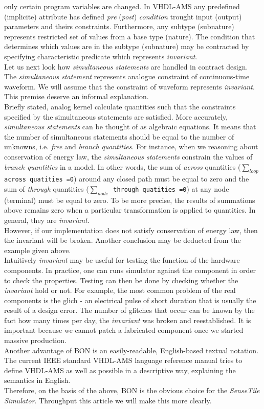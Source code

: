 \documentclass{article}
\newcommand{\STS}{\emph{SenseTile Simulator}\xspace}
\newcommand{\inv}{\emph{invariant}\xspace}
\newcommand{\arcoss}{\emph{across}\xspace}
\newcommand{\through}{\emph{through}\xspace}
\begin{document}
only certain program variables are changed.
In VHDL-AMS any predefined (implicite) attribute 
has defined \emph{pre} (\emph{post}) \emph{condition} trought input (output)
parameters and theirs constraints. Furthermore, any subtype (subnature)
represents restricted set of values from a base type (nature).
The condition that determines which values are in the subtype (subnature) 
may be contracted by specifying characteristic predicate which represents \inv.\\
Let us next look how \emph{simultaneous statements} are handled in contract design.
The \emph{simultaneous statement} represents analogue constraint of
continuous-time waveform. We will assume that the constraint of waveform
represents \inv. This premise deserve an informal explanation.\\
Briefly stated, analog kernel calculate quantities such
that the constraints specified by the simultaneous statements are satisfied.
More accurately, \emph{simultaneous statements} can be thought of as
algebraic equations. It means that the number of simultaneous statements
should be equal to the number of unknowns, i.e. \emph{free} and \emph{branch}
\emph{quantities}. For instance, when we reasoning about conservation of energy law,
the \emph{simultaneous statements} constrain the values of \emph{branch quantities}
in a model.
In other words, the sum of \arcoss quantities (\texttt{$\sum_{loop}$ across quatities =0})
around any closed path must be equal to zero and the sum of \through
quantities (\texttt{$\sum_{node}$ through quatities =0}) at any node
(terminal) must be equal to zero. To be more precise, the results of summations 
above remains zero when a particular transformation is applied to quantities.
In general, they are \inv. \\
However, if our implementation does not satisfy conservation of energy law, 
 then the invariant will be broken. 
Another conclusion may be deducted from the example given above.\\
Intuitively \inv may be useful for testing the function of the hardware components.
In practice, one can runs simulator against the component in order to check 
the properties. Testing can then be done by checking whether the \inv hold or not.
For example, the most common problem of the real components is the glich - an electrical pulse 
of short duration that is usually the result of a design error.
The number of glitches that occur can be known by the fact how many times per day, 
the \inv was broken and reestablished. 
It is important because we cannot patch a fabricated component once we started
massive production. \\
Another advantage of BON is an easily-readable, English-based textual notation.
The current IEEE standard VHDL-AMS language reference manual tries to define
VHDL-AMS as well as possible in a descriptive way, explaining the
semantics in English.\\
Therefore, on the basis of the above, BON is the obvious choice
for the \STS.
Throughput this article we will make this more clearly. 
\end{document}
